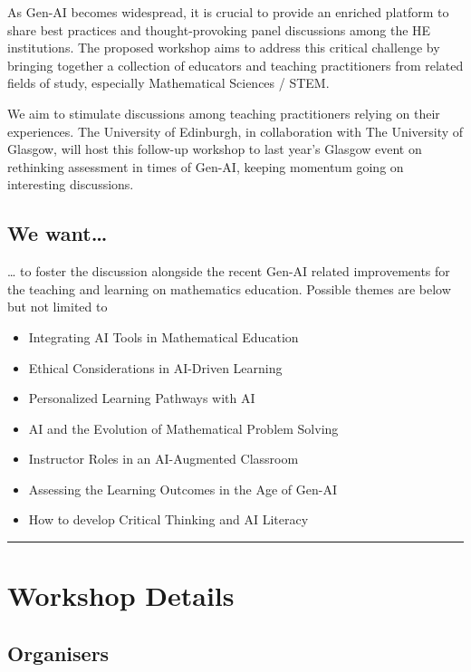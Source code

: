 \documentclass[
  letterpaper,
  DIV=11,
  numbers=noendperiod]{scrartcl}
\providecommand{\tightlist}{%
  \setlength{\itemsep}{0pt}\setlength{\parskip}{0pt}}\usepackage{longtable,booktabs,array}
\begin{document}
As Gen-AI becomes widespread, it is crucial to provide an enriched
platform to share best practices and thought-provoking panel discussions
among the HE institutions. The proposed workshop aims to address this
critical challenge by bringing together a collection of educators and
teaching practitioners from related fields of study, especially
Mathematical Sciences / STEM.

We aim to stimulate discussions among teaching practitioners relying on
their experiences. The University of Edinburgh, in collaboration with
The University of Glasgow, will host this follow-up workshop to last
year's Glasgow event on rethinking assessment in times of Gen-AI,
keeping momentum going on interesting discussions.

\hypertarget{we-want}{%
\subsection{We want\ldots{}}\label{we-want}}

\ldots{} to foster the discussion alongside the recent Gen-AI related
improvements for the teaching and learning on mathematics education.
Possible themes are below but not limited to

\begin{itemize}
\tightlist
\item
  Integrating AI Tools in Mathematical Education
\item
  Ethical Considerations in AI-Driven Learning
\item
  Personalized Learning Pathways with AI
\item
  AI and the Evolution of Mathematical Problem Solving
\item
  Instructor Roles in an AI-Augmented Classroom
\item
  Assessing the Learning Outcomes in the Age of Gen-AI
\item
  How to develop Critical Thinking and AI Literacy
\end{itemize}

\begin{center}\rule{0.5\linewidth}{0.5pt}\end{center}

\hypertarget{workshop-details}{%
\section{Workshop Details}\label{workshop-details}}

\hypertarget{organisers}{%
\subsection{Organisers}\label{organisers}}
\end{document}
